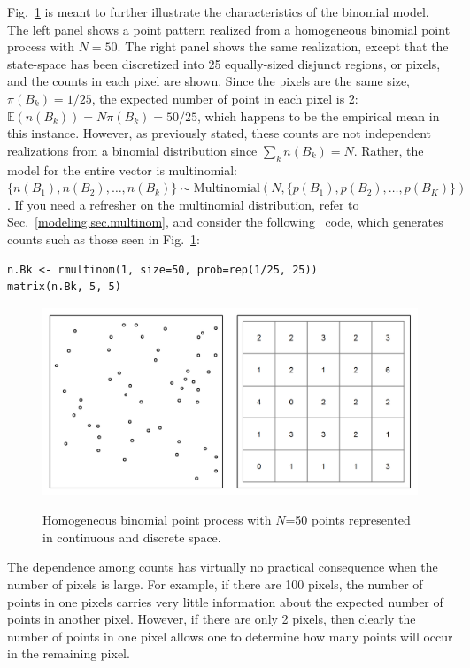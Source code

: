 Fig.~\ref{state-space.fig.homo} is meant to further illustrate the characteristics
of the binomial model. The left panel shows a point pattern
realized from a
homogeneous binomial point process with $N=50$. The right panel shows
the same realization, except that the state-space has been discretized
into 25 equally-sized disjunct regions, or pixels, and the counts in each pixel
are shown. Since the pixels are the same
size, $\pi(B_k) = 1/25$, the expected number of point in each
pixel is 2: $\mathbb{E}(n(B_k)) = N\pi(B_k) = 50/25$, which
happens to be the empirical mean in this instance. However, as
previously stated, these counts are not
independent realizations from a binomial distribution since $\sum_k
n(B_k) = N$. Rather, the model for the entire vector is multinomial:
$\{n(B_1), n(B_2), \dots, n(B_k)\} \sim \mbox{Multinomial}(N, \{p(B_1), p(B_2), \dots,
p(B_K) \})$ \citep{illian_etal:2008}. If you need a refresher on the
multinomial distribution, refer to Sec.~\ref{modeling.sec.multinom}, and
consider the following \R~code, which generates counts such as those
seen in Fig.~\ref{state-space.fig.homo}:
\begin{verbatim}
n.Bk <- rmultinom(1, size=50, prob=rep(1/25, 25))
matrix(n.Bk, 5, 5)
\end{verbatim}

\begin{figure}%
\centering
\includegraphics[width=\textwidth]{Ch11/figs/homoPlots}
\label{state-space.fig.homo}
\caption{Homogeneous binomial point process with $N$=50 points
  represented in continuous and discrete space.}
\end{figure}

The dependence among counts has virtually
no practical consequence when the number of pixels is large. For
example, if there are 100 pixels, the number of points in one pixels
carries very little information about the expected number of points in another
pixel. However, if there are only 2 pixels, then clearly the number of
points in one pixel allows one to determine how many points will occur in the
remaining pixel.

